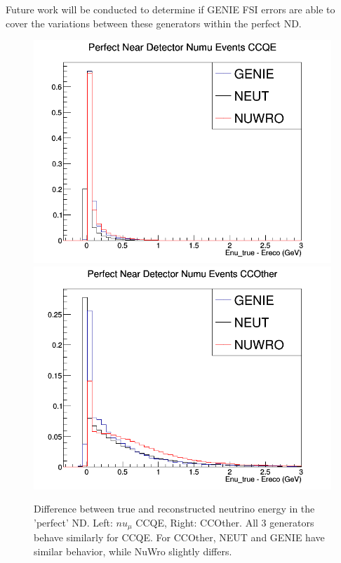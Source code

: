 \documentclass[12pt]{article}
\begin{document}
Future work will be conducted to determine if GENIE FSI errors are able to cover the variations between these generators within the perfect ND.
\begin{figure}[h]
\centering
{}
\includegraphics[width=\linewidth]{Ereco_Etrue/numu_perfect_ND_CCQE.png}
\endminipage
{}
\includegraphics[width=\linewidth]{Ereco_Etrue/numu_perfect_ND_CCOther.png}
\endminipage
\caption{Difference between true and reconstructed neutrino energy in the 'perfect' ND. Left: $nu_\mu$ CCQE, Right: CCOther. All 3 generators behave similarly for CCQE. For CCOther, NEUT and GENIE have similar behavior, while NuWro slightly differs.}
\label{fig:numu_Etrue_ereco_perfect}
\end{figure}
\end{document}
